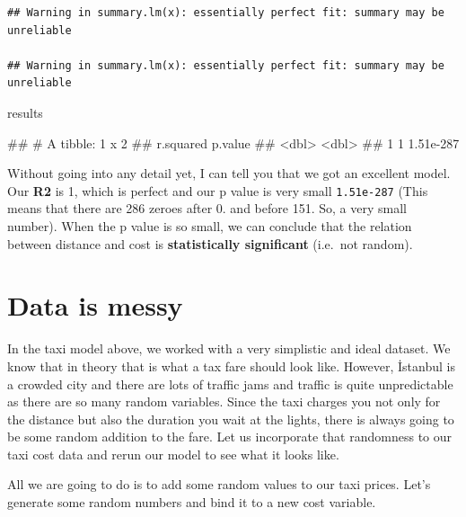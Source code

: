 \documentclass[
]{book}
\newenvironment{Shaded}{\begin{snugshade}}{\end{snugshade}}
\newcommand{\NormalTok}[1]{#1}
\begin{document}
\begin{verbatim}
## Warning in summary.lm(x): essentially perfect fit: summary may be unreliable

## Warning in summary.lm(x): essentially perfect fit: summary may be unreliable
\end{verbatim}

\begin{Shaded}
\begin{Highlighting}[]
\NormalTok{results}
\end{Highlighting}
\end{Shaded}

\begin{Shaded}
\begin{Highlighting}[]
\NormalTok{\#\# \# A tibble: 1 x 2}
\NormalTok{\#\#   r.squared   p.value}
\NormalTok{\#\#       \textless{}dbl\textgreater{}     \textless{}dbl\textgreater{}}
\NormalTok{\#\# 1         1 1.51e{-}287}
\end{Highlighting}
\end{Shaded}

Without going into any detail yet, I can tell you that we got an excellent model. Our \textbf{R2} is 1, which is perfect and our p value is very small \texttt{1.51e-287} (This means that there are 286 zeroes after 0. and before 151. So, a very small number). When the p value is so small, we can conclude that the relation between distance and cost is \textbf{statistically significant} (i.e.~not random).

\hypertarget{data-is-messy}{%
\section{Data is messy}\label{data-is-messy}}

In the taxi model above, we worked with a very simplistic and ideal dataset. We know that in theory that is what a tax fare should look like. However, İstanbul is a crowded city and there are lots of traffic jams and traffic is quite unpredictable as there are so many random variables. Since the taxi charges you not only for the distance but also the duration you wait at the lights, there is always going to be some random addition to the fare. Let us incorporate that randomness to our taxi cost data and rerun our model to see what it looks like.

All we are going to do is to add some random values to our taxi prices. Let's generate some random numbers and bind it to a new cost variable.
\end{document}
